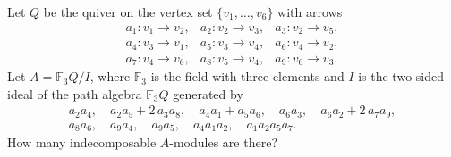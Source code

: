 Let $Q$ be the quiver on the vertex set $\{v_1,\dots,v_6\}$ with arrows
\[
\begin{array}{lll}
a_1\colon v_1\to v_2, & a_2\colon v_2\to v_3, & a_3\colon v_2\to v_5,\\
a_4\colon v_3\to v_1, & a_5\colon v_3\to v_4, & a_6\colon v_4\to v_2,\\
a_7\colon v_4\to v_6, & a_8\colon v_5\to v_4, & a_9\colon v_6\to v_3.
\end{array}
\]
Let $A = \mathbb{F}_3 Q / I$, where $\mathbb{F}_3$ is the field with three elements and $I$ is the two-sided ideal of the path algebra $\mathbb{F}_3 Q$ generated by
\[
\begin{array}{l}
a_2 a_4,\quad a_2 a_5 + 2\,a_3 a_8,\quad a_4 a_1 + a_5 a_6,\quad a_6 a_3,\quad a_6 a_2 + 2\,a_7 a_9,\\
a_8 a_6,\quad a_9 a_4,\quad a_9 a_5,\quad a_4 a_1 a_2,\quad a_1 a_2 a_5 a_7.
\end{array}
\]
How many indecomposable $A$-modules are there?
